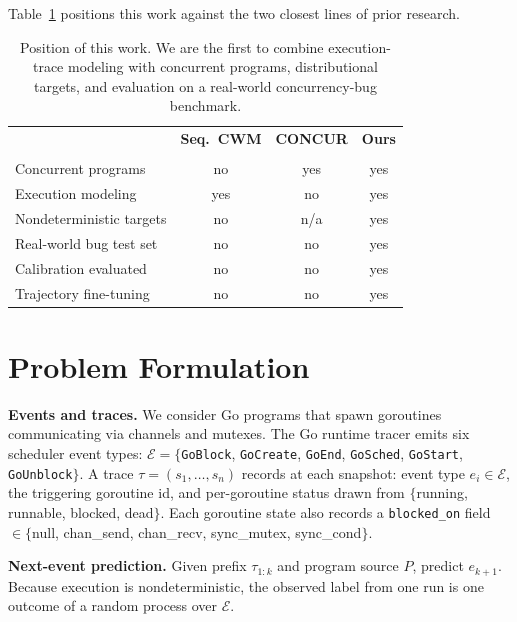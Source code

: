 \documentclass[10pt,conference]{IEEEtran}
\newcommand{\eblock}{\texttt{GoBlock}}
\newcommand{\eunblock}{\texttt{GoUnblock}}
\newcommand{\estart}{\texttt{GoStart}}
\newcommand{\ecreate}{\texttt{GoCreate}}
\newcommand{\eend}{\texttt{GoEnd}}
\newcommand{\esched}{\texttt{GoSched}}
\begin{document}
Table~\ref{tab:position} positions this work against the two closest lines of prior research.

\begin{table}[t]
\centering
\caption{Position of this work. We are the first to combine execution-trace modeling with concurrent programs, distributional targets, and evaluation on a real-world concurrency-bug benchmark.}
\label{tab:position}
\vspace*{8pt}
\small
\begin{tabular}{@{}p{2.9cm}ccc@{}}
\toprule
 & \textbf{Seq.\ CWM} & \textbf{CONCUR} & \textbf{Ours}\\
 & \textbf{\cite{cwm}} & \textbf{\cite{concur}} & \\
\midrule
Concurrent programs        & no  & yes & yes\\
Execution modeling         & yes & no  & yes\\
Nondeterministic targets   & no  & n/a & yes\\
Real-world bug test set    & no  & no  & yes\\
Calibration evaluated      & no  & no  & yes\\
Trajectory fine-tuning     & no  & no  & yes\\
\bottomrule
\end{tabular}
\end{table}

\section{Problem Formulation}\label{sec:problem}

\textbf{Events and traces.}
We consider Go programs that spawn goroutines communicating via channels
and mutexes.
The Go runtime tracer emits six scheduler event types:
$\mathcal{E}=\{$\eblock, \ecreate, \eend, \esched, \estart,
\eunblock$\}$.
A trace $\tau{=}(s_1,\dots,s_n)$ records at each snapshot: event type
$e_i\in\mathcal{E}$, the triggering goroutine id, and per-goroutine
status drawn from $\{$running, runnable, blocked, dead$\}$.
Each goroutine state also records a \texttt{blocked\_on} field
$\in\{$null, chan\_send, chan\_recv, sync\_mutex, sync\_cond$\}$.

\textbf{Next-event prediction.}
Given prefix $\tau_{1:k}$ and program source $P$, predict $e_{k+1}$.
Because execution is nondeterministic, the observed label from one run
is one outcome of a random process over $\mathcal{E}$.
\end{document}
